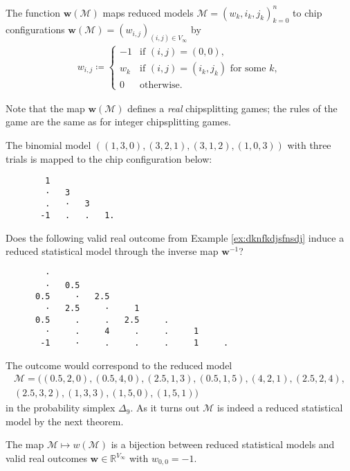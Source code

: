 The function \( \mathbf w(\mathcal{M}) \) maps reduced models \( \mathcal{M} = (w_k, i_k, j_k)^{n}_{k=0} \) to chip configurations \( \mathbf w(\mathcal{M}) = (w_{i,j})_{(i,j) \in V_\infty} \) by 
\begin{align*}
    w_{i,j} \coloneqq \begin{cases}
        -1 & \text{if } (i,j) = (0,0), \\
        w_k & \text{if } (i,j) = (i_k, j_k) \text{ for some } k, \\
        0 & \text{otherwise}.
    \end{cases}
\end{align*}

Note that the map \( \mathbf w(\mathcal{M}) \) defines a \emph{real} chipsplitting games; the rules of the game are the same as for integer chipsplitting games.

\begin{example}\label{ex:binomial-model-chip-three}
    The binomial model \( ((1,3,0), (3,2,1), (3,1,2), (1,0,3)) \) with three trials is mapped to the chip configuration below:
    \begin{verbatim}
        1
        ·   3  
        .   ·   3
       -1   .   .   1.
    \end{verbatim}
\end{example}

\begin{example}\label{ex:alpaca-andy}
    Does the following valid real outcome from Example \ref{ex:dknfkdjsfnsdj} induce a reduced statistical model through the inverse map \( \mathbf w^{-1} \)?
    \begin{verbatim}
        · 
        ·   0.5 
      0.5     ·   2.5 
        ·   2.5     ·     1 
      0.5     .     .   2.5     . 
        ·     .     4     .     .     1 
       -1     ·     .     .     .     1     . 
    \end{verbatim} 
    The outcome would correspond to the reduced model
    \begin{gather*}
        \mathcal{M} = ((0.5, 2, 0), (0.5, 4, 0), (2.5, 1,3), (0.5, 1, 5), (4, 2,1), (2.5, 2, 4),\\ (2.5, 3,2), (1, 3,3), (1, 5,0), (1,5,1))
    \end{gather*}
    in the probability simplex \( \Delta_9 \). As it turns out \( \mathcal{M} \) is indeed a reduced statistical model by the next theorem.
\end{example}

\begin{theorem}\label{thm:outcome-reduced-model}
    The map \( \mathcal{M} \mapsto w(\mathcal{M}) \) is a bijection between reduced statistical models and valid real outcomes \( \mathbf w \in \mathbb{R}^{V_\infty} \) with \( w_{0,0} = -1 \).
\end{theorem}

